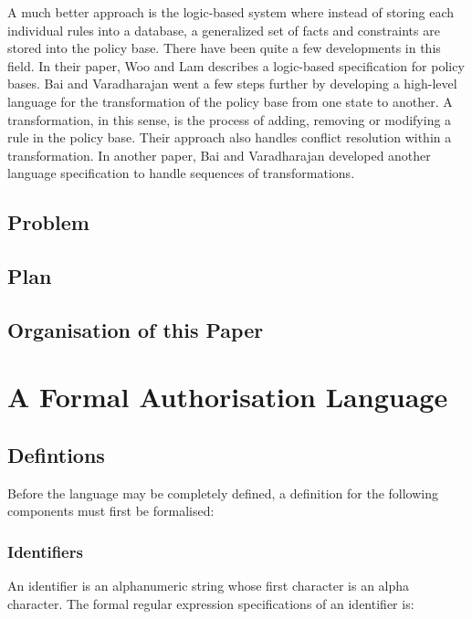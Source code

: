 \documentclass[a4paper]{article}
\begin{document}
      A much better approach is the logic-based system where instead of
      storing each individual rules into a database, a generalized set of
      facts and constraints are stored into the policy base. There have been
      quite a few developments in this field. In their paper, Woo and Lam
      \cite{WL} describes a logic-based specification for policy bases. Bai and
      Varadharajan \cite{BV1} went a few steps further by developing a
      high-level language for the transformation of the policy base from one
      state to another. A transformation, in this sense, is the process of
      adding, removing or modifying a rule in the policy base. Their approach
      also handles conflict resolution within a transformation. In another
      paper, Bai and Varadharajan \cite{BV2} developed another language
      specification to handle sequences of transformations.

    \subsection{Problem}

    \subsection{Plan}

    \subsection{Organisation of this Paper}

    \pagebreak

  \section{A Formal Authorisation Language}

    \subsection{Defintions}

      Before the language may be completely defined, a definition for the
      following components must first be formalised:
 
      \subsubsection{Identifiers}

        An identifier is an alphanumeric string whose first character is an
        alpha character. The formal regular expression specifications of an
        identifier is:
\end{document}
